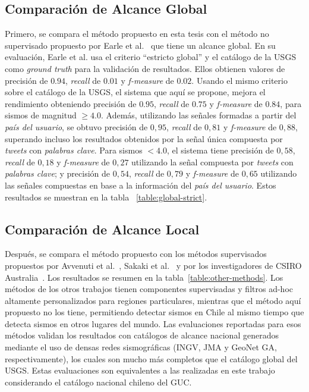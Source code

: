 \subsection{Comparación de Alcance Global}

Primero, se compara el método propuesto en esta tesis con el método no supervisado propuesto por Earle et al.~\cite{earle2010omg,earle2012twitter} que tiene un alcance global. En su evaluación, Earle et al. usa el criterio ``estricto global'' y el catálogo de la USGS como {\em ground truth} para la validación de resultados. Ellos obtienen valores de precisión de $0.94$, {\em recall} de $0.01$ y {\em f-measure} de $0.02$. Usando el mismo criterio sobre el catálogo de la USGS, el sistema que aquí se propone, mejora el rendimiento obteniendo precisión de $0.95$, {\em recall} de $0.75$ y {\em f-measure}  de $0.84$, para sismos de magnitud $\geq 4.0$. Además, utilizando las señales formadas a partir del {\em país del usuario}, se obtuvo precisión de $0,95$, {\em recall} de $0,81$ y {\em f-measure} de $0,88$, superando incluso los resultados obtenidos por la señal única compuesta por \textit{tweets} con {\em palabras clave}. Para sismos $<4.0$, el sistema tiene precisión de $0,58$, {\em recall} de $0,18$ y {\em f-measure}  de $0,27$ utilizando la señal compuesta por \textit{tweets} con {\em palabras clave}; y precisión de $0,54$, {\em recall} de $0,79$ y {\em f-measure} de $0,65$ utilizando las señales compuestas en base a la información del {\em país del usuario}. Estos resultados se muestran en la tabla ~\ref{table:global-strict}.


\subsection{Comparación de Alcance Local}

Después, se compara el método propuesto con los métodos supervisados propuestos por Avvenuti et al.~\cite{avvenuti2014earthquake,avvenuti2014ears}, Sakaki et al.~\cite{sakaki2013tweet,sakaki2010earthquake} y por los investigadores de CSIRO Australia~\cite{yin2012using,robinson2013sensitive}.
%
Los resultados se resumen en la tabla~\ref{table:other-methods}. 
%
Los métodos de los otros trabajos tienen componentes supervisadas y filtros ad-hoc altamente personalizados para regiones particulares, mientras que el método aquí propuesto no los tiene, permitiendo detectar sismos en Chile al mismo tiempo que detecta sismos en otros lugares del mundo. 
%
Las evaluaciones reportadas para esos métodos validan los resultados con catálogos de alcance nacional generados mediante el uso de densas redes sismográficas (INGV, JMA y GeoNet GA, respectivamente), los cuales son mucho más completos que el catálogo global del USGS. Estas evaluaciones son equivalentes a las realizadas en este trabajo considerando el catálogo nacional chileno del GUC. 

